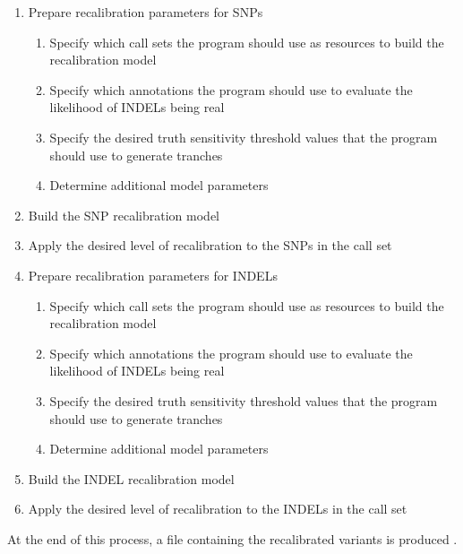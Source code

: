 \begin{enumerate}
	\item Prepare recalibration parameters for SNPs
	\begin{enumerate}
    	\item Specify which call sets the program should use as resources to build the recalibration model
    	\item Specify which annotations the program should use to evaluate the likelihood of INDELs being real
    	\item Specify the desired truth sensitivity threshold values that the program should use to generate tranches
    	\item Determine additional model parameters
    \end{enumerate}

	\item Build the SNP recalibration model
	\item Apply the desired level of recalibration to the SNPs in the call set
	\item Prepare recalibration parameters for INDELs 
    	\begin{enumerate}
    	\item Specify which call sets the program should use as resources to build the recalibration model 
    	\item Specify which annotations the program should use to evaluate the likelihood of INDELs being real 
    	\item Specify the desired truth sensitivity threshold values that the program should use to generate tranches 
    	\item Determine additional model parameters
    \end{enumerate}
	\item Build the INDEL recalibration model
	\item Apply the desired level of recalibration to the INDELs in the call set
\end{enumerate}
At the end of this process, a file containing the recalibrated variants is produced \cite{runVQSR}.

